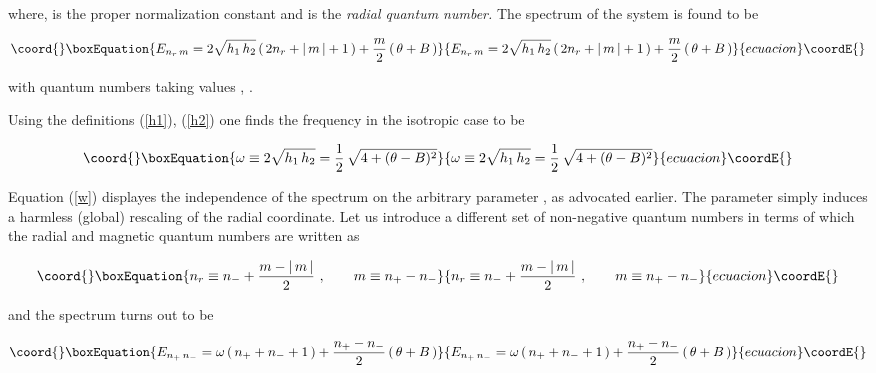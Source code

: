 \documentclass[a4paper,aps,prd,preprint]{revtex4}
\begin{document}
  where, \coordHE{} is the proper normalization constant and \coordHE{} is the 
  {\it radial quantum number.} The spectrum of the system is found  to be
	
	\begin{equation}\coord{}\boxEquation{
        E_{n_r\, m}= 2\sqrt{h_1\, h_2}\left(\, 2n_r +|\, m\, | + 1\,\right) 
        +{m\over 2} \left(\, \theta +B\,\right) \label{energy}
        }{
        E_{n_r\, m}= 2\sqrt{h_1\, h_2}\left(\, 2n_r +|\, m\, | + 1\,\right) 
        +{m\over 2} \left(\, \theta +B\,\right) }{ecuacion}\coordE{}\end{equation}

	with quantum numbers taking values \coordHE{},
	\coordHE{}.
   
   Using the definitions  (\ref{h1}), (\ref{h2}) one finds the frequency
   in the isotropic case to be
   
        \begin{equation}\coord{}\boxEquation{
         \omega\equiv  2\sqrt{h_1\, h_2}= {1\over 2}\, \sqrt{4 +(\theta-B)^2}
        \label{w}
        }{
         \omega\equiv  2\sqrt{h_1\, h_2}= {1\over 2}\, \sqrt{4 +(\theta-B)^2}
        }{ecuacion}\coordE{}\end{equation}
  
   Equation (\ref{w}) displayes the independence of the spectrum
   on the arbitrary parameter \coordHE{}, as advocated earlier.
   The parameter \coordHE{} simply induces a harmless (global) rescaling of the 
   radial coordinate. Let us introduce a different set of non-negative quantum 
   numbers \coordHE{} \cite{messhia} in terms of which the radial and 
   magnetic quantum numbers are written as 
   
   \begin{equation}\coord{}\boxEquation{
   n_r\equiv n_- +{m-|\,m\,|\over 2} \ ,\qquad m\equiv n_+ - n_-
   }{
   n_r\equiv n_- +{m-|\,m\,|\over 2} \ ,\qquad m\equiv n_+ - n_-
   }{ecuacion}\coordE{}\end{equation}
   
   and the spectrum turns out to be
   
   \begin{equation}\coord{}\boxEquation{
    E_{n_+\, n_-}= \omega\left(\, n_+ + n_- + 1\,\right) +{ n_+ - n_-\over 2}
    \left(\, \theta +B\,\right) \label{e+-}
    }{
    E_{n_+\, n_-}= \omega\left(\, n_+ + n_- + 1\,\right) +{ n_+ - n_-\over 2}
    \left(\, \theta +B\,\right) }{ecuacion}\coordE{}\end{equation}
    
\end{document}
